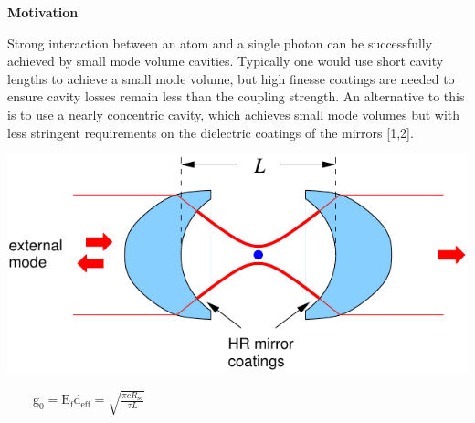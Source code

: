 \documentclass[portrait,a0,final]{a0poster} %
\makeatletter
\newenvironment{figurehere}
  {\def\@captype{figure}}
  {}
\newenvironment{poster}{
  \begin{center}
  \begin{minipage}[c]{0.98\textwidth}
}{
  \end{minipage} 
  \end{center}
}
\makeatother
\begin{document}
\begin{poster}
\vspace{0.2cm}



\vspace{5cm}
\begin{multicols}{2}
\setlength{\parskip}{1ex plus 0.5ex minus 0.2ex}

      \begin{center}
          \begin{center}{\bf \Large \textsf {Motivation}}\end{center}
      \end{center}

 Strong interaction between an atom and a single photon can be successfully achieved by small mode volume cavities. Typically one would use short cavity lengths to achieve a small mode volume, but high finesse coatings are needed to ensure cavity losses remain less than the coupling strength. An alternative to this is to use a nearly concentric cavity, which achieves small mode volumes but with less stringent requirements on the dielectric coatings of the mirrors [1,2].

\begin{figurehere}

    \begin{multicols}{2}
        \begin{center}
            \includegraphics[width=\columnwidth]{cavitything}
            {
              
                $\qquad \mathrm{g_0}= \mathrm{E_f}\mathrm{d_{eff}} =
                \sqrt{\frac{\pi c R_{\mathrm{sc}}}{\tau L}}
            $}
    \columnbreak
    \hspace*{2cm}


\end{center}
\end{multicols}
\end{figurehere}
\end{multicols}
\end{poster}
\end{document}
